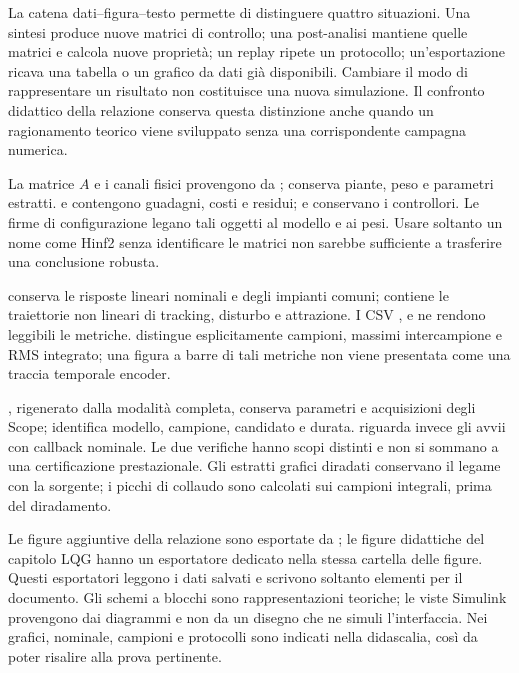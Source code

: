 La catena dati--figura--testo permette di distinguere quattro situazioni.
Una sintesi produce nuove matrici di controllo; una post-analisi mantiene
quelle matrici e calcola nuove proprietà; un replay ripete un protocollo;
un'esportazione ricava una tabella o un grafico da dati già disponibili.
Cambiare il modo di rappresentare un risultato non costituisce una nuova
simulazione. Il confronto didattico della relazione conserva questa
distinzione anche quando un ragionamento teorico viene sviluppato senza
una corrispondente campagna numerica.

La matrice $A$ e i canali fisici provengono da ;
 conserva piante, peso e parametri estratti.
 e  contengono guadagni, costi e residui;
 e  conservano i controllori.
Le firme di configurazione legano tali oggetti al modello e ai pesi.
Usare soltanto un nome come Hinf2 senza identificare le matrici non
sarebbe sufficiente a trasferire una conclusione robusta.

 conserva le risposte lineari nominali e degli
impianti comuni;  contiene le traiettorie non lineari
di tracking, disturbo e attrazione. I CSV ,
 e  ne rendono leggibili le
metriche.  distingue esplicitamente campioni, massimi
intercampione e RMS integrato; una figura a barre di tali metriche
non viene presentata come una traccia temporale encoder.

, rigenerato dalla modalità completa, conserva parametri
e acquisizioni degli Scope;  identifica modello, campione, candidato e durata.
 riguarda invece gli avvii con callback
nominale. Le due verifiche hanno scopi distinti e non si sommano a una
certificazione prestazionale. Gli estratti grafici diradati conservano
il legame con la sorgente; i picchi di collaudo sono calcolati sui
campioni integrali, prima del diradamento.

Le figure aggiuntive della relazione sono esportate da
; le figure didattiche del
capitolo LQG hanno un esportatore dedicato nella stessa cartella delle figure.
Questi esportatori leggono i dati salvati e scrivono soltanto elementi
per il documento. Gli schemi a blocchi sono rappresentazioni teoriche;
le viste Simulink provengono dai diagrammi e non da un disegno che ne
simuli l'interfaccia. Nei grafici, nominale, campioni e protocolli sono
indicati nella didascalia, così da poter risalire alla prova pertinente.

